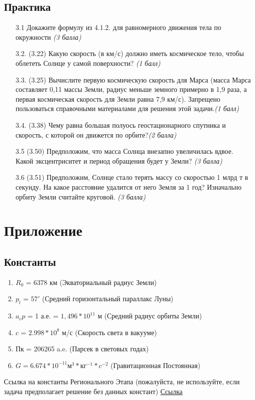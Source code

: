 \documentclass[16pt,a4paper]{report}
\begin{document}
\section{Практика}
\begin{enumerate}
    \item [3.1] Докажите формулу из 4.1.2. для равномерного движения тела по окружности \emph{(3 балла)}
    \item [3.2.] (3.22) Какую скорость (в км/с) должно иметь космическое тело, чтобы облететь Солнце у самой поверхности? \emph{(1 балл)}
    \item [3.3.] (3.25) Вычислите первую космическую скорость для Марса (масса Марса составляет 0,11 массы Земли, радиус меньше земного примерно в 1,9 раза, а первая космическая скорость для Земли равна 7,9 км/с). Запрещено пользоваться справочными материалами для решения этой задачи.\emph{(1 балл)}
    \item [3.4.] (3.38) Чему равна большая полуось геостационарного спутника и скорость, с которой он движется по орбите?\emph{(2 балла)}
    \item [3.5] (3.50) Предположим, что масса Солнца внезапно увеличилась вдвое. Какой эксцентриситет и период обращения будет у Земли? \emph{(3 балла)}
    \item [3.6] (3.51) Предположим, Солнце стало терять массу со скоростью 1 млрд т в секунду. На какое расстояние удалится от него Земля за 1 год? Изначально орбиту Земли считайте круговой. \emph{(3 балла)}
    
\end{enumerate}
\newpage
\chapter{Приложение}
\section{Константы}
\begin{enumerate}
    \item $R_0$ = 6378 км (Экваториальный радиус Земли)
    \item $p_l$ = $57'$ (Средний горизонтальный параллакс Луны)
    \item $a_cp$ = 1 а.е. = $1,496 * 10^{11}$ м (Средний радиус орбиты Земли)
    \item $c$ = $2.998 * 10^8$ м/с (Скорость света в вакууме)
    \item Пк = 206265 a.e. (Парсек в световых годах)
    \item $G = 6.674 * 10^{-11} \textrm{м}^3*\textrm{кг}^{-1}*c^{-2}$ (Гравитационная Постоянная)
\end{enumerate}
Ссылка на константы Регионального Этапа (пожалуйста, не используйте, если задача предполагает решение без данных констант)
\href{https://всош.цпм.рф/upload/files/Arhive_tasks/2022-23/reg/astr/spdata-astr-9-11-reg-22-23.pdf}{Ссылка}
\end{document}
